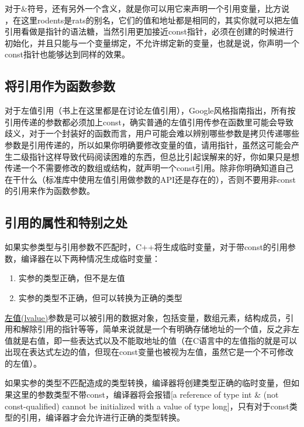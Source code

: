 对于\&符号，还有另外一个含义，就是你可以用它来声明一个引用变量，比方说\\ ，在这里rodents是rats的别名，它们的值和地址都是相同的，其实你就可以把左值引用看做是指针的语法糖，当然引用更加接近const指针，必须在创建的时候进行初始化，并且只能与一个变量绑定，不允许绑定新的变量，也就是说，你声明一个const指针也能够达到同样的效果。

\subsection{将引用作为函数参数}

对于左值引用（书上在这里都是在讨论左值引用），Google风格指南指出，所有按引用传递的参数都必须加上const，确实普通的左值引用传参在函数里可能会导致歧义，对于一个封装好的函数而言，用户可能会难以辨别哪些参数是拷贝传递哪些参数是引用传递的，所以如果你明确要修改变量的值，请用指针，虽然这可能会产生二级指针这样导致代码阅读困难的东西，但总比引起误解来的好，你如果只是想传递一个不需要修改的数组或结构，就声明一个const引用。除非你明确知道自己在干什么（标准库中使用左值引用做参数的API还是存在的），否则不要用非const的引用来作为函数参数。

\subsection{引用的属性和特别之处}

如果实参类型与引用参数不匹配时，C++将生成临时变量，对于带const的引用参数，编译器在以下两种情况生成临时变量：

\begin{enumerate}
\item 实参的类型正确，但不是左值
\item 实参的类型不正确，但可以转换为正确的类型
\end{enumerate}

\href{https://zh.cppreference.com/w/cpp/language/value_category}{左值(lvalue)}\thinspace 参数是可以被引用的数据对象，包括变量，数组元素，结构成员，引用和解除引用的指针等等，简单来说就是一个有明确存储地址的一个值，反之非左值就是右值，即一些表达式以及不能取地址的值（在C语言中的左值指的就是可以出现在表达式左边的值，但现在const变量也被视为左值，虽然它是一个不可修改的左值）。

如果实参的类型不匹配造成的类型转换，编译器将创建类型正确的临时变量，但如果这里的参数类型不带const，编译器将会报错[a reference of type int \& (not const-qualified) cannot be initialized with a value of type long]，只有对于const类型的引用，编译器才会允许进行正确的类型转换。

